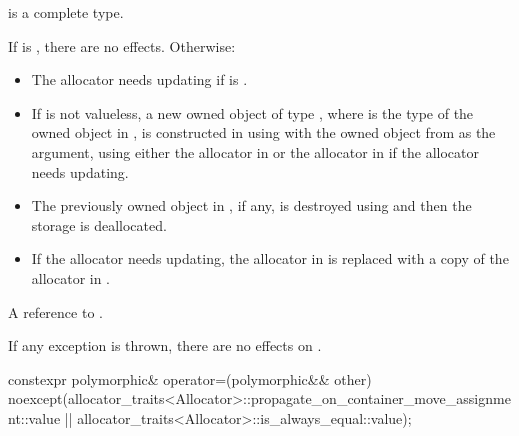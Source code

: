\begin{itemdescr}
\pnum
\mandates
{} is a complete type.

\pnum
\effects
If  is , there are no effects.
Otherwise:

\begin{itemize}
\item
The allocator needs updating if
is .

\item
If  is not valueless,
a new owned object of type ,
where  is the type of the owned object in ,
is constructed in  using
 with
the owned object from  as the argument, using either
the allocator in  or
the allocator in  if the allocator needs updating.

\item
The previously owned object in , if any,
is destroyed using  and
then the storage is deallocated.

\item
If the allocator needs updating,
the allocator in  is replaced with
a copy of the allocator in .
\end{itemize}

\pnum
\returns
A reference to .

\pnum
\remarks
If any exception is thrown, there are no effects on .
\end{itemdescr}

%
\begin{itemdecl}
constexpr polymorphic& operator=(polymorphic&& other)
  noexcept(allocator_traits<Allocator>::propagate_on_container_move_assignment::value ||
           allocator_traits<Allocator>::is_always_equal::value);
\end{itemdecl}

